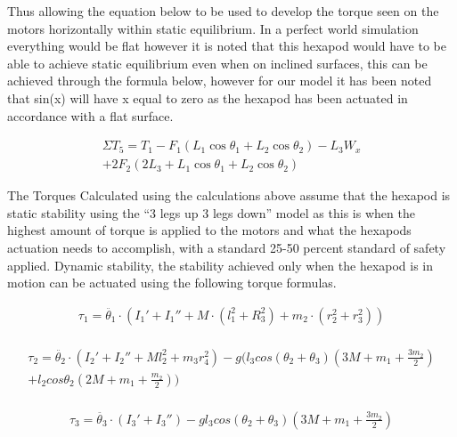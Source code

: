 Thus allowing the equation below to be used to develop the torque seen on the motors horizontally within static equilibrium. In a perfect world simulation everything would be flat however it is noted that this hexapod would have to be able to achieve static equilibrium even when on inclined surfaces, this can be achieved through the formula below, however for our model it has been noted that sin(x) will have x equal to zero as the hexapod has been actuated in accordance with a flat surface. 
\cite{urrea2016design}




\begin{multline} \label{eq: Torque Seen Horizontally}
\Sigma T_5 = T_1 - F_1 (L_1 \cos \theta_1 + L_2 \cos \theta_2) - L_3 W_x\\ + 2F_2 (2L_3 + L_1 \cos \theta_1 + L_2 \cos \theta_2)
\end{multline}


The Torques Calculated using the calculations above assume that the hexapod is static stability using the “3 legs up 3 legs down” model as this is when the highest amount of torque is applied to the motors and what the hexapods actuation needs to accomplish, with a standard 25-50 percent standard of safety applied. Dynamic stability, the stability achieved only when the hexapod is in motion can be actuated using the following torque formulas.
\cite{Barai2013SMARTHexBotAS}


\begin{multline} \label{Dynamic Stability Torque}
\tau_1 = \ddot{\theta_1} \cdot ( I_1' + I_1'' + M \cdot (l_1^2+R_3^2 ) +m_2 \cdot ( r_2^2 +r_3^2 ))\\
\end{multline}

\begin{multline} \label{Dynamic Stability Torque2}
\tau_2 = \ddot{\theta_2} \cdot ( I_2' + I_2'' + Ml_2^2 +m_3r_4^2 ) - g (l_3 cos( \theta_2 + \theta_3 ) (3M + m_1 + \frac{3m_2}{2} )\\ + l_2 cos \theta_2 (2M +m_1 + \frac{m_2}{2} ))\\
\end{multline}

\begin{multline} \label{Dynamic Stability Torque3}
\tau_3 = \ddot{\theta_3} \cdot ( I_3' + I_3'' ) - g l_3 cos( \theta_2 + \theta_3 ) (3M + m_1 + \frac{3m_2}{2} )\\
\end{multline}

